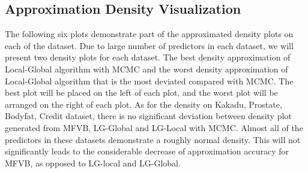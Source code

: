 \subsection{Approximation Density Visualization}
The following six plots demonstrate part of the approximated density plots on each of the dataset. Due to large number of predictors in each dataset, we will present two density plots for each dataset. The best density approximation of Local-Global algorithm with MCMC and the worst density approximation of Local-Global algorithm that is the most deviated compared with MCMC. The best plot will be placed on the left of each plot, and the worst plot will be arranged on the right of each plot.
As for the density on Kakadu, Prostate, Bodyfat, Credit dataset, there is no significant deviation between density plot generated from MFVB, LG-Global and LG-Local with MCMC. Almost all of the predictors in these datasets demonstrate a roughly normal density. This will not significantly leads to the considerable decrease of approximation accuracy for MFVB, as opposed to LG-local and LG-Global.
